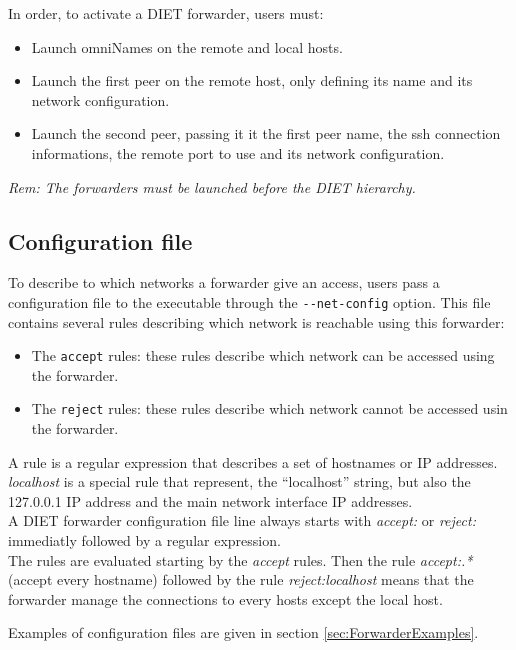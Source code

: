 \noindent In order, to activate a DIET forwarder, users must:
\begin{itemize}
\item Launch omniNames on the remote and local hosts.
\item Launch the first peer on the remote host, only defining its name
  and its network configuration.
\item Launch the second peer, passing it it the first peer name, the
  ssh connection informations, the remote port to use and its network
  configuration.
\end{itemize}

\noindent\textit{Rem: The forwarders must be launched before the DIET
  hierarchy.}
\subsection{Configuration file}
To describe to which networks a forwarder give an access, users pass a
configuration file to the executable through the \verb#--net-config#
option. This file contains several rules describing which network is
reachable using this forwarder:
\begin{itemize}
\item The \verb#accept# rules: these rules describe which network can
  be accessed using the forwarder.
\item The \verb#reject# rules: these rules describe which network
  cannot be accessed usin the forwarder.\\
\end{itemize}

A rule is a regular expression that describes a set of hostnames or IP
addresses. \textit{localhost} is a special rule that represent, the
``localhost'' string, but also the 127.0.0.1 IP address and the main
network interface IP addresses.\\

A DIET forwarder configuration file line always starts with
\textit{accept:} or \textit{reject:} immediatly followed by a regular
expression.\\

The rules are evaluated starting by the \textit{accept} rules. Then
the rule \textit{accept:.*} (accept every hostname) followed by the
rule \textit{reject:localhost} means that the forwarder manage the
connections to every hosts except the local host.

Examples of configuration files are given in section
\ref{sec:ForwarderExamples}.


